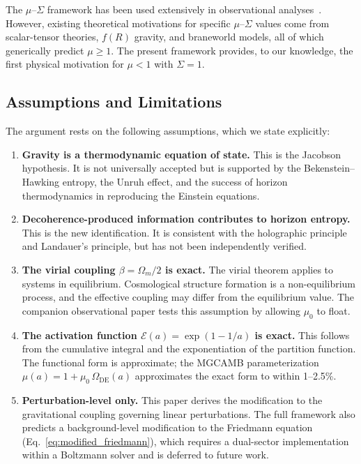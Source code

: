 \documentclass[11pt]{article}
\begin{document}
The $\mu$--$\Sigma$ framework has been used extensively in observational
analyses~\citep{PogosianSilvestri2016,Abbott2023,Andrade2024,DESIDR1}.
However, existing theoretical motivations for specific $\mu$--$\Sigma$ values
come from scalar-tensor theories, $f(R)$ gravity, and braneworld models, all of
which generically predict $\mu \geq 1$.  The present framework provides, to our
knowledge, the first physical motivation for $\mu < 1$ with $\Sigma = 1$.

\subsection{Assumptions and Limitations}

The argument rests on the following assumptions, which we state explicitly:

\begin{enumerate}
\item \textbf{Gravity is a thermodynamic equation of state.}  This is the
  Jacobson hypothesis.  It is not universally accepted but is supported by the
  Bekenstein--Hawking entropy, the Unruh effect, and the success of horizon
  thermodynamics in reproducing the Einstein equations.

\item \textbf{Decoherence-produced information contributes to horizon entropy.}
  This is the new identification.  It is consistent with the holographic
  principle~\citep{tHooft1993,Susskind1995} and Landauer's
  principle, but has not been independently verified.

\item \textbf{The virial coupling $\beta = \Omega_m/2$ is exact.}  The virial
  theorem applies to systems in equilibrium.  Cosmological structure formation
  is a non-equilibrium process, and the effective coupling may differ from
  the equilibrium value.  The companion observational paper tests this
  assumption by allowing $\mu_0$ to float.

\item \textbf{The activation function $\mathcal{E}(a) = \exp(1 - 1/a)$ is
  exact.}  This follows from the cumulative integral and the exponentiation
  of the partition function.  The functional form is approximate; the
  MGCAMB parameterization $\mu(a) = 1 + \mu_0\,\Omega_\mathrm{DE}(a)$
  approximates the exact form to within 1--2.5\%.

\item \textbf{Perturbation-level only.}  This paper derives the modification
  to the gravitational coupling governing linear perturbations.  The full
  framework also predicts a background-level modification to the Friedmann
  equation (Eq.~\ref{eq:modified_friedmann}), which requires a dual-sector
  implementation within a Boltzmann solver and is deferred to future work.
\end{enumerate}
\end{document}
